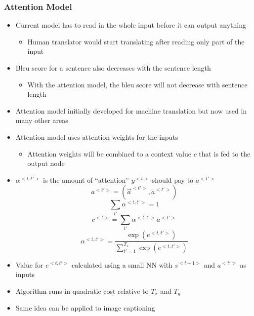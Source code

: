 \documentclass[12pt, letterpaper]{article}
\begin{document}
    \subsubsection{Attention Model}
    \begin{itemize}
        \item Current model has to read in the whole input before it can output anything
        \begin{itemize}
            \item Human translator would start translating after reading only part of the input
        \end{itemize}
        \item Bleu score for a sentence also decreases with the sentence length  
        \begin{itemize}
            \item With the attention model, the bleu score will not decrease with sentence length
        \end{itemize}
        \item Attention model initially developed for machine translation but now used in many other areas
        \item Attention model uses attention weights for the inputs
        \begin{itemize}
            \item Attention weights will be combined to a context value $c$ that is fed to the output node
        \end{itemize}
        \item $\alpha^{<t,t'>}$ is the amount of ``attention'' $y^{<t>}$ should pay to $a^{<t'>}$
        $$a^{<t'>}=(\overrightarrow{a}^{<t'>},\overleftarrow{a}^{<t'>})$$
        $$\sum_{t'}\alpha^{<t,t'>}=1$$
        $$c^{<t>}=\sum_{t'}\alpha^{<t,t'>}a^{<t'>}$$
        $$\alpha^{<t,t'>}=\frac{\exp(e^{<t,t'>})}{\sum_{t'=1}^{T_x}\exp(e^{<t,t'>})}$$
        \item Value for $e^{<t,t'>}$ calculated using a small NN with $s^{<t-1>}$ and $a^{<t'>}$ as inputs
        \item Algorithm runs in quadratic cost relative to $T_x$ and $T_y$
        \item Same idea can be applied to image captioning
    \end{itemize}
\end{document}
